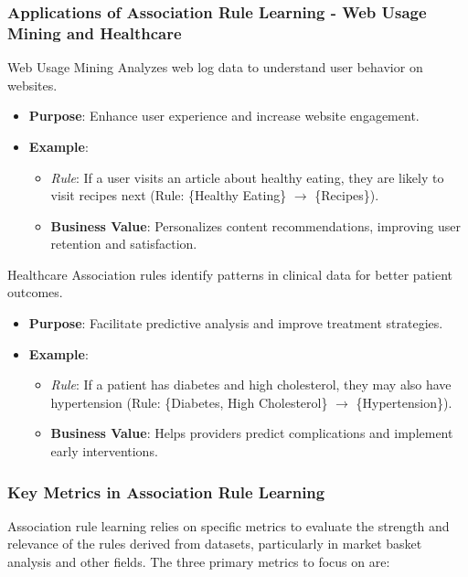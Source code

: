 \documentclass{beamer}
\begin{document}
\begin{frame}[fragile]
    \frametitle{Applications of Association Rule Learning - Web Usage Mining and Healthcare}
    \begin{block}{Web Usage Mining}
        Analyzes web log data to understand user behavior on websites.
    \end{block}
    \begin{itemize}
        \item \textbf{Purpose}: Enhance user experience and increase website engagement.
        \item \textbf{Example}:
        \begin{itemize}
            \item \textit{Rule}: If a user visits an article about healthy eating, they are likely to visit recipes next (Rule: \{Healthy Eating\} $\rightarrow$ \{Recipes\}).
            \item \textbf{Business Value}: Personalizes content recommendations, improving user retention and satisfaction.
        \end{itemize}
    \end{itemize}
    
    \begin{block}{Healthcare}
        Association rules identify patterns in clinical data for better patient outcomes.
    \end{block}
    \begin{itemize}
        \item \textbf{Purpose}: Facilitate predictive analysis and improve treatment strategies.
        \item \textbf{Example}:
        \begin{itemize}
            \item \textit{Rule}: If a patient has diabetes and high cholesterol, they may also have hypertension (Rule: \{Diabetes, High Cholesterol\} $\rightarrow$ \{Hypertension\}).
            \item \textbf{Business Value}: Helps providers predict complications and implement early interventions.
        \end{itemize}
    \end{itemize}
\end{frame}

\begin{frame}[fragile]
    \frametitle{Key Metrics in Association Rule Learning}
    Association rule learning relies on specific metrics to evaluate the strength and relevance of the rules derived from datasets, particularly in market basket analysis and other fields. The three primary metrics to focus on are:
\end{frame}
\end{document}
